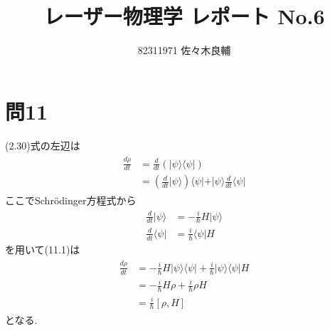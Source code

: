 \documentclass[uplatex,a4j,11pt,dvipdfmx]{jsarticle}
\begin{document}
\title{レーザー物理学 レポート No.6}
\author{82311971 佐々木良輔}
\date{}
\maketitle
\section*{問11}
\setcounter{section}{11}
\setcounter{equation}{0}
(2.30)式の左辺は
\begin{align}
  \begin{split}
    \frac{d\rho}{dt}&=\frac{d}{dt}\left(|\psi\rangle\langle\psi|\right)\\
    &=\left(\frac{d}{dt}|\psi\rangle\right)\langle\psi|+|\psi\rangle\frac{d}{dt}\langle\psi|
  \end{split}
\end{align}
ここでSchr\"{o}dinger方程式から
\begin{align}
  \frac{d}{dt}|\psi\rangle&=-\frac{i}{\hbar}H|\psi\rangle\\
  \frac{d}{dt}\langle\psi|&=\frac{i}{\hbar}\langle\psi|H
\end{align}
を用いて(11.1)は
\begin{align}
  \begin{split}
    \frac{d\rho}{dt}&=-\frac{i}{\hbar}H|\psi\rangle\langle\psi|+\frac{i}{\hbar}|\psi\rangle\langle\psi|H\\
    &=-\frac{i}{\hbar}H\rho+\frac{i}{\hbar}\rho H\\
    &=\frac{i}{\hbar}[\rho,H]
  \end{split}
\end{align}
となる.
\newpage
\end{document}
